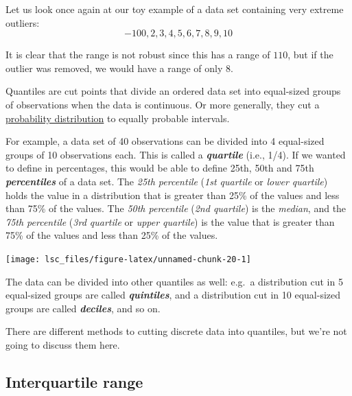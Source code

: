 \documentclass[
  11pt,
  a4paper,
  twoside,symmetric,openright]{book}
\theoremstyle{break}
\theoremstyle{break}
\begin{document}
\begin{example}
\protect\hypertarget{exm:exrange2}{}\label{exm:exrange2}Let us look once again at our toy example of a data set containing very extreme outliers:
\[
-100,2,3,4,5,6,7,8,9,10
\]

It is clear that the range is not robust since this has a range of \(110\), but if the outlier was removed, we would have a range of only \(8\).
\end{example}

\label{calloutquantile}
\begin{callout}[Quantiles]

Quantiles are cut points that divide an ordered data set into equal-sized groups of observations when the data is continuous. Or more generally, they cut a \hyperref[probability]{probability distribution} to equally probable intervals.

For example, a data set of 40 observations can be divided into 4 equal-sized groups of 10 observations each. This is called a \textbf{\emph{quartile}} (i.e., 1/4). If we wanted to define in percentages, this would be able to define 25th, 50th and 75th \textbf{\emph{percentiles}} of a data set. The \emph{25th percentile} (\emph{1st quartile} or \emph{lower quartile}) holds the value in a distribution that is greater than 25\% of the values and less than 75\% of the values. The \emph{50th percentile} (\emph{2nd quartile}) is the \emph{median}, and the \emph{75th percentile} (\emph{3rd quartile} or \emph{upper quartile}) is the value that is greater than 75\% of the values and less than 25\% of the values.

\begin{center}\texttt{[image: lsc\_files/figure-latex/unnamed-chunk-20-1]} \end{center}

The data can be divided into other quantiles as well: e.g.~a distribution cut in 5 equal-sized groups are called \textbf{\emph{quintiles}}, and a distribution cut in 10 equal-sized groups are called \textbf{\emph{deciles}}, and so on.

There are different methods to cutting discrete data into quantiles, but we're not going to discuss them here.

\end{callout}

\subsection{Interquartile range}\label{IQR}
\end{document}

